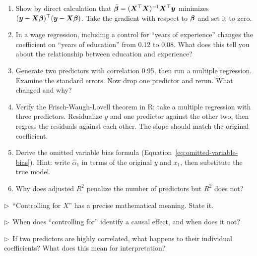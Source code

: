 \begin{enumerate}
  \item Show by direct calculation that $\hat{\bm{\beta}} = (\bm{X}^\top \bm{X})^{-1}\bm{X}^\top \bm{y}$ minimizes $(\bm{y} - \bm{X}\bm{\beta})^\top(\bm{y} - \bm{X}\bm{\beta})$. Take the gradient with respect to $\bm{\beta}$ and set it to zero.

  \item In a wage regression, including a control for ``years of experience'' changes the coefficient on ``years of education'' from 0.12 to 0.08. What does this tell you about the relationship between education and experience?

  \item Generate two predictors with correlation 0.95, then run a multiple regression. Examine the standard errors. Now drop one predictor and rerun. What changed and why?

  \item Verify the Frisch-Waugh-Lovell theorem in R: take a multiple regression with three predictors. Residualize $y$ and one predictor against the other two, then regress the residuals against each other. The slope should match the original coefficient.

  \item Derive the omitted variable bias formula (Equation~\ref{eq:omitted-variable-bias}). Hint: write $\hat\alpha_1$ in terms of the original $y$ and $x_1$, then substitute the true model.

  \item Why does adjusted $R^2$ penalize the number of predictors but $R^2$ does not?
\end{enumerate}

\begin{reflect}
$\triangleright$~``Controlling for $X$'' has a precise mathematical meaning. State it.

\smallskip
$\triangleright$~When does ``controlling for'' identify a causal effect, and when does it not?

\smallskip
$\triangleright$~If two predictors are highly correlated, what happens to their individual coefficients? What does this mean for interpretation?
\end{reflect}
